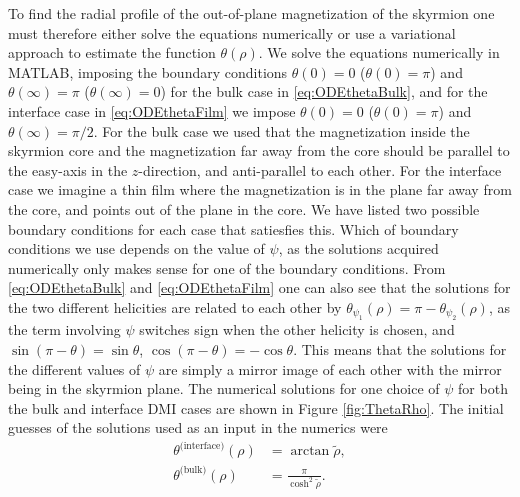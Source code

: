 \documentclass[12pt, a4paper, twoside, openright]{article}		%
\numberwithin{equation}{section}
\begin{document}
To find the radial profile of the out-of-plane magnetization of the skyrmion one must therefore either solve the equations numerically or use a variational approach to estimate the function $\theta(\rho)$. We solve the equations numerically in MATLAB, imposing the boundary conditions $\theta(0) = 0$ ($\theta(0) = \pi$) and $\theta(\infty) = \pi$ ($\theta(\infty) = 0$) for the bulk case in \eqref{eq:ODEthetaBulk}, and for the interface case in \eqref{eq:ODEthetaFilm} we impose $\theta(0) = 0$ ($\theta(0) = \pi$) and $\theta(\infty) = \pi/2$. For the bulk case we used that the magnetization inside the skyrmion core and the magnetization far away from the core should be parallel to the easy-axis in the $z$-direction, and anti-parallel to each other. For the interface case we imagine a thin film where the magnetization is in the plane far away from the core, and points out of the plane in the core. We have listed two possible boundary conditions for each case that satiesfies this. Which of boundary conditions we use depends on the value of $\psi$, as the solutions acquired numerically only makes sense for one of the boundary conditions. From \eqref{eq:ODEthetaBulk} and \eqref{eq:ODEthetaFilm} one can also see that the solutions for the two different helicities are related to each other by $\theta_{\psi_1}(\rho) = \pi - \theta_{\psi_2}(\rho)$, as the term involving $\psi$ switches sign when the other helicity is chosen, and $\sin(\pi-\theta) = \sin\theta$, $\cos(\pi-\theta) = -\cos\theta$. This means that the solutions for the different values of $\psi$ are simply a mirror image of each other with the mirror being in the skyrmion plane. The numerical solutions for one choice of $\psi$ for both the bulk and interface DMI cases are shown in Figure \ref{fig:ThetaRho}. The initial guesses of the solutions used as an input in the numerics were
\begin{align}
\theta^{\text{(interface)}}(\rho) &= \arctan\tilde{\rho}, \\
\theta^{\text{(bulk)}}(\rho) &= \frac{\pi}{\cosh^2\tilde{\rho}}.
\end{align}
\end{document}
